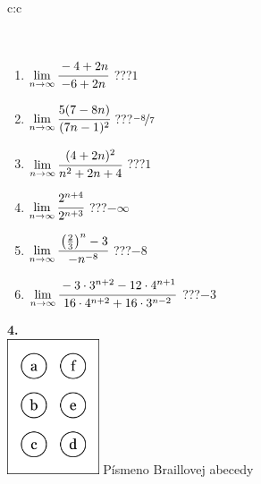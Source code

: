 \documentclass[10pt]{report}
\begin{document}
\begin{tabular}{c:c}
\begin{minipage}[c][104.5mm][t]{0.5\linewidth}
\begin{center}
\begin{minipage}{0.95\linewidth}
\begin{center}
\end{center}
\end{minipage}
\\[1mm]
\begin{minipage}{0.79\linewidth}
\begin{center}
\begin{varwidth}{\linewidth}
\begin{enumerate}
\normalsize
\item $\lim\limits_{n\to\infty}\cfrac{-4+2n}{-6+2n}$\quad \dotfill\; ???\;\dotfill \quad $1$
\item $\lim\limits_{n\to\infty}\cfrac{5(7-8n)}{(7n-1)^2}$\quad \dotfill\; ???\;\dotfill \quad $\nicefrac{-8}{7}$
\item $\lim\limits_{n\to\infty}\cfrac{(4+2n)^2}{n^2+2n+4}$\quad \dotfill\; ???\;\dotfill \quad $1$
\item $\lim\limits_{n\to\infty}\cfrac{2^{n+4}}{2^{n+3}}$\quad \dotfill\; ???\;\dotfill \quad $-\infty$
\item $\lim\limits_{n\to\infty}\cfrac{\left(\frac{2}{3}\right)^n -3}{-n^{-8}}$\quad \dotfill\; ???\;\dotfill \quad $-8$
\item $\lim\limits_{n\to\infty}\cfrac{-3\cdot 3^{n+2}-12\cdot 4^{n+1}}{16\cdot 4^{n+2}+16\cdot 3^{n-2}}$\quad \dotfill\; ???\;\dotfill \quad $-3$
\end{enumerate}
\end{varwidth}
\end{center}
\end{minipage}
\begin{minipage}{0.20\linewidth}
\begin{center}
{\Huge\bfseries 4.} \\[2mm]
\includegraphics[height=40mm]{../images/braille.png}
{\small Písmeno Braillovej abecedy}
\end{center}
\end{minipage}
\end{center}
\end{minipage}
%
\end{tabular}
\newpage
\thispagestyle{empty}
\end{document}
